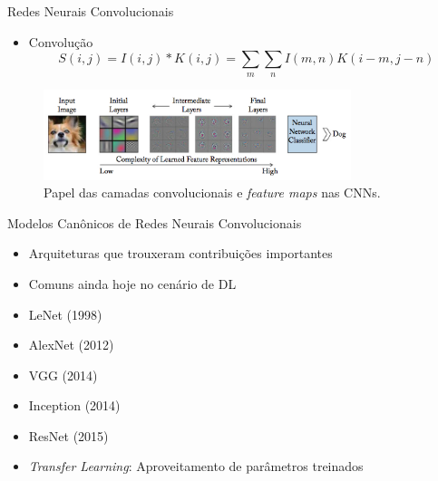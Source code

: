 \begin{frame}{Redes Neurais Convolucionais}
   \ \  \\[0.1cm]
   \begin{itemize}
     \item Convolução
     \begin{equation}
      S(i,j) = I(i,j)*K(i,j) = \sum_{m}\sum_{n}I(m,n)K(i-m,j-n)\label{eq:conv_img}
     \end{equation}
   \end{itemize}
   \begin{figure}[!h]
   	\centering
   	\label{fig:convolutions}
   	\includegraphics[width=0.8\textwidth]{./img/fundamenta/convolutions}
     \caption{Papel das camadas convolucionais e \emph{feature maps} nas CNNs.}
   \end{figure}
\end{frame}

\begin{frame}{\LARGE{Modelos Canônicos de Redes Neurais Convolucionais}}
   \ \  \\[0.1cm]
   \begin{itemize}
     \item Arquiteturas que trouxeram contribuições importantes
     \item Comuns ainda hoje no cenário de DL
     \ \ \newline
     \item LeNet (1998)
     \item AlexNet (2012)
     \item VGG (2014)
     \item Inception (2014)
     \item ResNet (2015)
     \ \ \newline
     \item \emph{Transfer Learning}: Aproveitamento de parâmetros treinados
   \end{itemize}
\end{frame}
